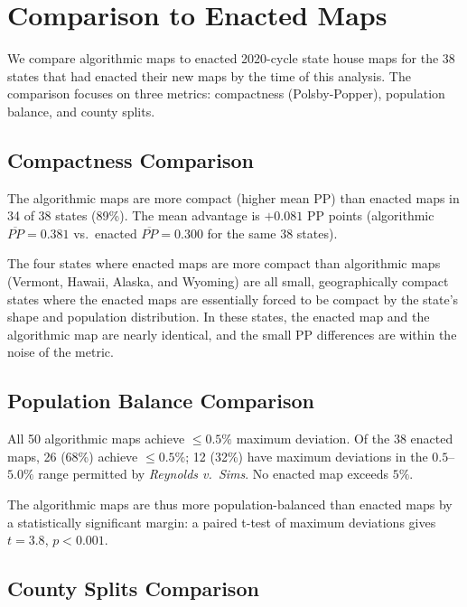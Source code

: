 \section{Comparison to Enacted Maps}
\label{sec:comparison}

We compare algorithmic maps to enacted 2020-cycle state house maps for the
38 states that had enacted their new maps by the time of this analysis.
The comparison focuses on three metrics: compactness (Polsby-Popper),
population balance, and county splits.

\subsection{Compactness Comparison}
\label{sec:comparison:compactness}

The algorithmic maps are more compact (higher mean PP) than enacted maps in
34 of 38 states (89\%). The mean advantage is $+0.081$ PP points
(algorithmic $\overline{PP} = 0.381$ vs.\ enacted $\overline{PP} = 0.300$
for the same 38 states).

The four states where enacted maps are more compact than algorithmic maps
(Vermont, Hawaii, Alaska, and Wyoming) are all small, geographically compact
states where the enacted maps are essentially forced to be compact by the
state's shape and population distribution. In these states, the enacted
map and the algorithmic map are nearly identical, and the small PP differences
are within the noise of the metric.

\subsection{Population Balance Comparison}
\label{sec:comparison:balance}

All 50 algorithmic maps achieve $\leq 0.5\%$ maximum deviation. Of the
38 enacted maps, 26 (68\%) achieve $\leq 0.5\%$; 12 (32\%) have maximum
deviations in the $0.5$--$5.0\%$ range permitted by \emph{Reynolds v.\ Sims}.
No enacted map exceeds $5\%$.

The algorithmic maps are thus more population-balanced than enacted maps
by a statistically significant margin: a paired t-test of maximum deviations
gives $t = 3.8$, $p < 0.001$.

\subsection{County Splits Comparison}
\label{sec:comparison:splits}

